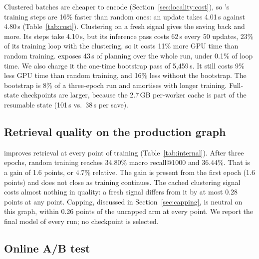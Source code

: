 Clustered batches are cheaper to encode (Section~\ref{sec:locality:cost}), so \ours{}'s training steps are 16\% faster
than random ones: an update takes 4.01\,s against 4.80\,s (Table~\ref{tab:cost}). Clustering on a fresh signal
gives the saving back and more. Its steps take 4.10\,s, but its
inference pass costs 62\,s every 50 updates, 23\% of its training loop with the clustering, so it costs 11\% more GPU
time than random training. \ours{} exposes 43\,s of planning over the whole run, under 0.1\% of loop
time. We also charge it the one-time bootstrap pass of 5{,}459\,s. It still costs 9\% less GPU time than random
training, and 16\% less without the bootstrap. The bootstrap is 8\% of a three-epoch run and amortises with longer
training. Full-state checkpoints are larger, because the 2.7\,GB per-worker cache is part of the resumable state
(101\,s vs.\ 38\,s per save).

\subsection{Retrieval quality on the production graph}
\label{sec:method:results}



\ours{} improves retrieval at every point of training (Table~\ref{tab:internal}). After three epochs, random
training reaches 34.80\% macro recall@1000 and \ours{} 36.44\%. That is a gain of 1.6 points, or 4.7\% relative.
The gain is present from the first epoch (1.6 points) and does not close as training continues. The cached clustering
signal costs almost nothing in quality: a fresh signal differs from it by at most 0.28 points at any point. Capping, discussed in Section~\ref{sec:capping}, is neutral on this graph, within
0.26 points of the uncapped arm at every point.
We report the final model of every run; no checkpoint is selected.

\subsection{Online A/B test}
\label{sec:method:online}

